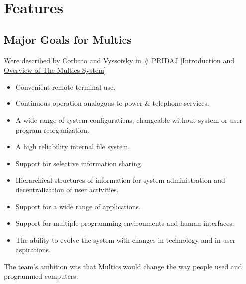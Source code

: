 \section{Features}


\subsection{Major Goals for Multics}

Were described by Corbato and Vyssotsky in # PRIDAJ \ref{Introduction and Overview of The Multics System}

\begin{itemize}
    \item Convenient remote terminal use.
    \item Continuous operation analogous to power & telephone services.
    \item A wide range of system configurations, changeable without system or user program reorganization.
    \item A high reliability internal file system.
    \item Support for selective information sharing.
    \item Hierarchical structures of information for system administration and decentralization of user activities.
    \item Support for a wide range of applications.
    \item Support for multiple programming environments and human interfaces.
    \item The ability to evolve the system with changes in technology and in user aspirations.
\end{itemize}

The team's ambition was that Multics would change the way people used and programmed computers.

